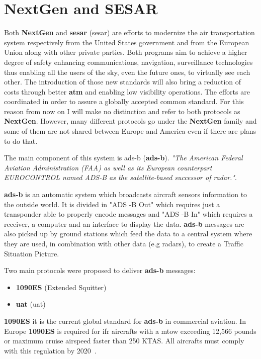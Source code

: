 \documentclass[../main.tex]{subfiles}
\begin{document}
\bigskip

\section{NextGen and SESAR}

Both \textbf{NextGen} and \textbf{\acrshort{sesar}} (\acrlong{sesar}) are efforts to modernize the air transportation system respectively from the United States government and from the European Union along with other private parties. Both programs aim to achieve a higher degree of safety enhancing communications, navigation, surveillance technologies thus enabling all the users of the sky, even the future ones, to virtually see each other. The introduction of those new standards will also bring a reduction of costs through better \textbf{\acrshort{atm}} and enabling low visibility operations. The efforts are coordinated in order to assure a globally accepted common standard. For this reason from now on I will make no distinction and refer to both protocols as \textbf{NextGen}. However, many different protocols go under the \textbf{NextGen} family and some of them are not shared between Europe and America even if there are plans to do that.

The main component of this system is \acrlong{ads-b} (\textbf{\acrshort{ads-b}}).
\textit{"The American Federal Aviation Administration (FAA) as well as its European counterpart EUROCONTROL named ADS-B as the satellite-based successor of radar."}\cite{stroh14}.

\textbf{\acrshort{ads-b}} is an automatic system which broadcasts aircraft sensors information to the outside world. It is divided in "ADS -B Out" which requires just a transponder able to properly encode messages and "ADS -B In" which requires a receiver, a computer and an interface to display the data.
\textbf{\acrshort{ads-b}} messages are also picked up by ground stations which feed the data to a central system where they are used, in combination with other data (e.g radars), to create a Traffic Situation Picture.

Two main protocols were proposed to deliver \textbf{\acrshort{ads-b}} messages:
\begin{itemize}
  \item \textbf{1090ES} (Extended Squitter)
  \item \textbf{\acrshort{uat}} (\acrlong{uat})
\end{itemize}

\textbf{1090ES} it is the current global standard for \textbf{\acrshort{ads-b}} in commercial aviation. In Europe \textbf{1090ES} is required for \acrshort{ifr} aircrafts with a \acrshort{mtow} exceeding 12,566 pounds or maximum cruise airspeed faster than 250 KTAS. All aircrafts must comply with this regulation by 2020~\cite{eu1090}.
\end{document}
